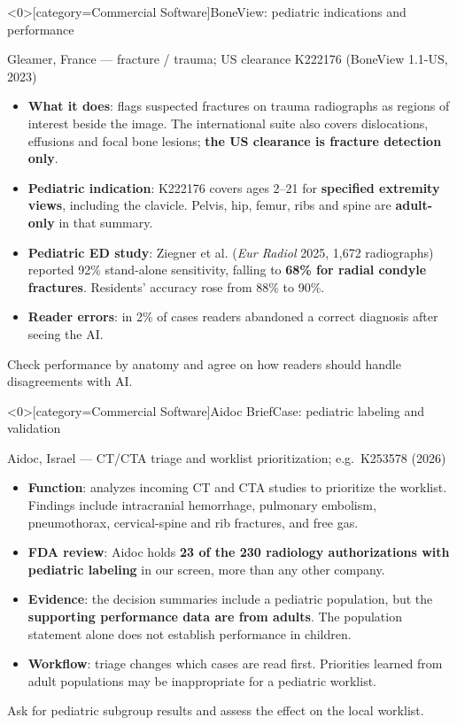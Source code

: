 \documentclass[aspectratio=169]{beamer}
\begin{document}
\begin{frame}<0>[category=Commercial Software]{BoneView: pediatric indications and performance}
\relax
{\scriptsize Gleamer, France --- fracture / trauma; US clearance K222176 (BoneView 1.1-US, 2023)\par}
\medskip
\small
\begin{itemize}
  \item \textbf{What it does}: flags suspected fractures on trauma radiographs as regions of interest beside the image. The international suite also covers dislocations, effusions and focal bone lesions; \textbf{the US clearance is fracture detection only}.
  \item \textbf{Pediatric indication}: K222176 covers ages 2--21 for \textbf{specified extremity views}, including the clavicle. Pelvis, hip, femur, ribs and spine are \textbf{adult-only} in that summary.
  \item \textbf{Pediatric ED study}: Ziegner et al. (\textit{Eur Radiol} 2025, 1,672 radiographs) reported 92\% stand-alone sensitivity, falling to \textbf{68\% for radial condyle fractures}. Residents' accuracy rose from 88\% to 90\%.
  \item \textbf{Reader errors}: in 2\% of cases readers abandoned a correct diagnosis after seeing the AI.
\end{itemize}
\medskip
Check performance by anatomy and agree on how readers should handle disagreements with AI.
\end{frame}

\begin{frame}<0>[category=Commercial Software]{Aidoc BriefCase: pediatric labeling and validation}
\relax
{\scriptsize Aidoc, Israel --- CT/CTA triage and worklist prioritization; e.g.\ K253578 (2026)\par}
\medskip
\small
\begin{itemize}
  \item \textbf{Function}: analyzes incoming CT and CTA studies to prioritize the worklist. Findings include intracranial hemorrhage, pulmonary embolism, pneumothorax, cervical-spine and rib fractures, and free gas.
  \item \textbf{FDA review}: Aidoc holds \textbf{23 of the 230 radiology authorizations with pediatric labeling} in our screen, more than any other company.
  \item \textbf{Evidence}: the decision summaries include a pediatric population, but the \textbf{supporting performance data are from adults}. The population statement alone does not establish performance in children.
  \item \textbf{Workflow}: triage changes which cases are read first. Priorities learned from adult populations may be inappropriate for a pediatric worklist.
\end{itemize}
\medskip
Ask for pediatric subgroup results and assess the effect on the local worklist.
\end{frame}
\end{document}

